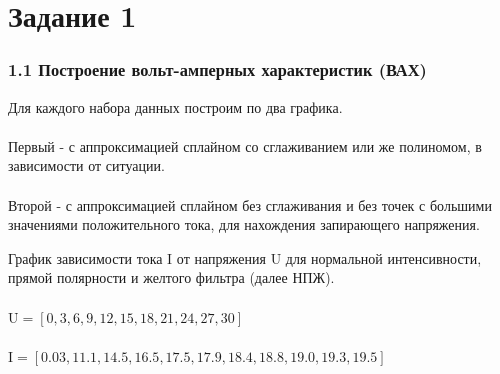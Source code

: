 \documentclass[12pt,openany]{book}
\title{\booktitle}
\author{\authorname}
\begin{document}


\chapter*{Задание 1}

\subsection*{1.1 Построение вольт-амперных характеристик (ВАХ)}

\vspace{10pt}

\noindent Для каждого набора данных построим по два графика.\\\\
Первый - с аппроксимацией сплайном со сглаживанием 
или же полиномом, в зависимости от ситуации.\\\\
Второй - с аппроксимацией сплайном без сглаживания и без точек с 
большими значениями положительного тока, для нахождения запирающего
напряжения.

\newpage

\noindent График зависимости тока I от напряжения U для нормальной интенсивности, 
прямой полярности и желтого фильтра (далее НПЖ).\\\\
$\text{U} = [0, 3, 6, 9, 12, 15, 18, 21, 24, 27, 30]$\\\\
$\text{I} = [0.03, 11.1, 14.5, 16.5, 17.5, 17.9, 18.4, 18.8, 19.0, 19.3, 19.5]$
\end{document}
